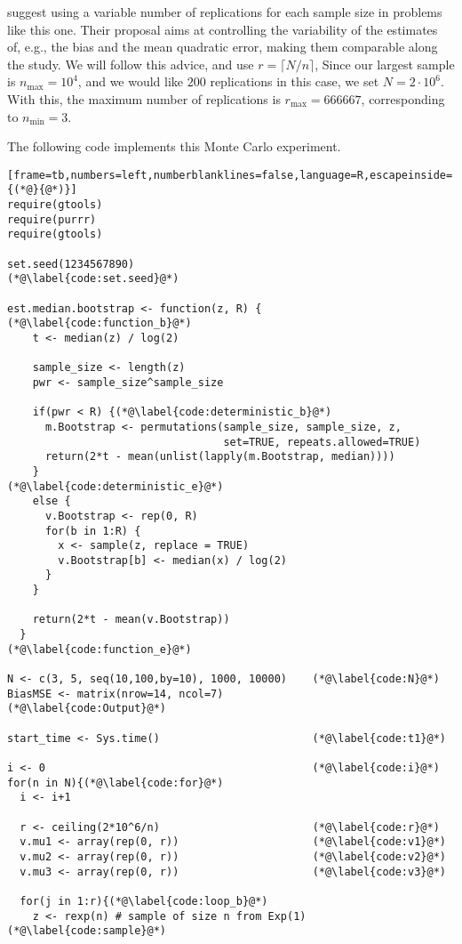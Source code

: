 \citet{busto92} suggest using a variable number of replications for each sample size in problems like this one.
Their proposal aims at controlling the variability of the estimates of, e.g., the bias and the mean quadratic error, making them comparable along the study.
We will follow this advice, and use $r=\lceil N/n\rceil$, 
Since our largest sample is $n_{\max}=10^4$, and we would like $200$ replications in this case, we set $N=2\cdot 10^6$.
With this, the maximum number of replications is $r_{\max}=666667$, corresponding to $n_{\min}=3$.

The following code implements this Monte Carlo experiment.

\begin{lstlisting}[frame=tb,numbers=left,numberblanklines=false,language=R,escapeinside={(*@}{@*)}]
require(gtools)
require(purrr)
require(gtools)

set.seed(1234567890)							(*@\label{code:set.seed}@*)

est.median.bootstrap <- function(z, R) {		(*@\label{code:function_b}@*)
    t <- median(z) / log(2)
    
    sample_size <- length(z)
    pwr <- sample_size^sample_size
    
    if(pwr < R) {(*@\label{code:deterministic_b}@*)
      m.Bootstrap <- permutations(sample_size, sample_size, z, 
                                  set=TRUE, repeats.allowed=TRUE)
      return(2*t - mean(unlist(lapply(m.Bootstrap, median))))
    } 																(*@\label{code:deterministic_e}@*)
    else {
      v.Bootstrap <- rep(0, R)
      for(b in 1:R) {
        x <- sample(z, replace = TRUE)
        v.Bootstrap[b] <- median(x) / log(2)
      }
    }
    
    return(2*t - mean(v.Bootstrap))
  }												(*@\label{code:function_e}@*)

N <- c(3, 5, seq(10,100,by=10), 1000, 10000)	(*@\label{code:N}@*)
BiasMSE <- matrix(nrow=14, ncol=7)				(*@\label{code:Output}@*)

start_time <- Sys.time()						(*@\label{code:t1}@*)

i <- 0											(*@\label{code:i}@*)
for(n in N){(*@\label{code:for}@*)
  i <- i+1
  
  r <- ceiling(2*10^6/n)						(*@\label{code:r}@*)
  v.mu1 <- array(rep(0, r))						(*@\label{code:v1}@*)
  v.mu2 <- array(rep(0, r))						(*@\label{code:v2}@*)
  v.mu3 <- array(rep(0, r))						(*@\label{code:v3}@*)
  
  for(j in 1:r){(*@\label{code:loop_b}@*)
    z <- rexp(n) # sample of size n from Exp(1)	(*@\label{code:sample}@*)
    

\end{lstlisting}
